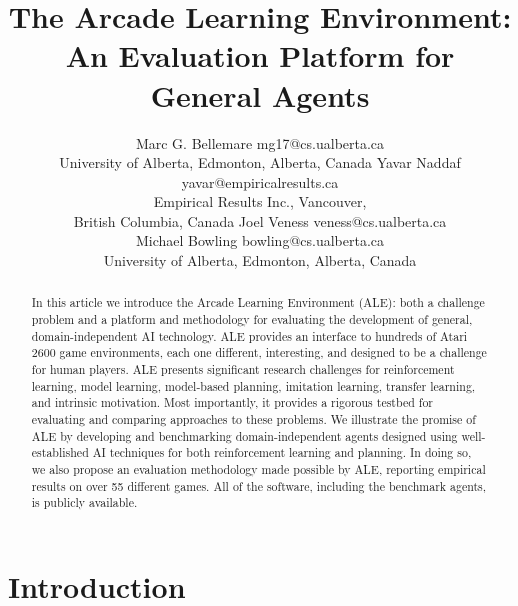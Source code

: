 \documentclass[twoside,11pt]{article}
\newif\ifjair
\begin{document}
\title{The Arcade Learning Environment:\\An Evaluation Platform for General Agents}

\author{\name Marc G. Bellemare \email mg17@cs.ualberta.ca \\
\addr University of Alberta, Edmonton, Alberta, Canada 
\AND
\name Yavar Naddaf \email yavar@empiricalresults.ca \\
\addr Empirical Results Inc., Vancouver, \\
British Columbia, Canada 
\AND
\name Joel Veness \email veness@cs.ualberta.ca \\
\name Michael Bowling \email bowling@cs.ualberta.ca \\
\addr University of Alberta, Edmonton, Alberta, Canada}



\ifjair\else
\thispagestyle{empty}
\fi

\maketitle

\begin{abstract}
In this article we introduce the Arcade Learning Environment (ALE): both a challenge problem and a platform and methodology for evaluating the development of general, domain-independent AI technology.  ALE provides an interface to hundreds of Atari 2600 game environments, each one different, interesting, and designed to be a challenge for human players.  ALE presents significant research challenges for reinforcement learning, model learning, model-based planning, imitation learning, transfer learning, and intrinsic motivation.  Most importantly, it provides a rigorous testbed for evaluating and comparing approaches to these problems.  We illustrate the promise of ALE by developing and benchmarking domain-independent agents designed using well-established AI techniques for both reinforcement learning and planning.  In doing so, we also propose an evaluation methodology made possible by ALE, reporting empirical results on over 55 different games.  All of the software, including the benchmark agents, is publicly available.
\end{abstract}

\section{Introduction}
\end{document}
